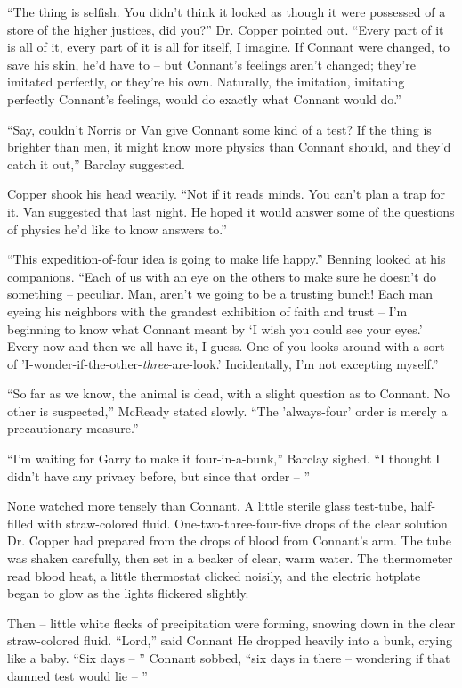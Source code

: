 \documentclass[letterpaper,openany,12pt]{memoir}		%
\begin{document}
``The thing is selfish. You didn't think it looked as though it were possessed
of a store of the higher justices, did you?'' Dr. Copper pointed out. ``Every
part of it is all of it, every part of it is all for itself, I imagine. If
Connant were changed, to save his skin, he'd have to -- but Connant's feelings
aren't changed; they're imitated perfectly, or they're his own. Naturally, the
imitation, imitating perfectly Connant's feelings, would do exactly what Connant
would do.''

``Say, couldn't Norris or Van give Connant some kind of a test? If the thing is
brighter than men, it might know more physics than Connant should, and they'd
catch it out,'' Barclay suggested.

Copper shook his head wearily. ``Not if it reads minds. You can't plan a trap
for it. Van suggested that last night. He hoped it would answer some of the
questions of physics he'd like to know answers to.''

``This expedition-of-four idea is going to make life happy.'' Benning looked at
his companions. ``Each of us with an eye on the others to make sure he doesn't
do something -- peculiar. Man, aren't we going to be a trusting bunch! Each man
eyeing his neighbors with the grandest exhibition of faith and trust -- I'm
beginning to know what Connant meant by `I wish you could see your eyes.' Every
now and then we all have it, I guess. One of you looks around with a sort of
'I-wonder-if-the-other-\emph{three}-are-look.' Incidentally, I'm not excepting
myself.''

``So far as we know, the animal is dead, with a slight question as to Connant.
No other is suspected,'' McReady stated slowly. ``The 'always-four' order is
merely a precautionary measure.''

``I'm waiting for Garry to make it four-in-a-bunk,'' Barclay sighed. ``I thought
I didn't have any privacy before, but since that order -- ''

None watched more tensely than Connant. A little sterile glass test-tube,
half-filled with straw-colored fluid. One-two-three-four-five drops of the clear
solution Dr. Copper had prepared from the drops of blood from Connant's arm. The
tube was shaken carefully, then set in a beaker of clear, warm water. The
thermometer read blood heat, a little thermostat clicked noisily, and the
electric hotplate began to glow as the lights flickered slightly.

Then -- little white flecks of precipitation were forming, snowing down in the
clear straw-colored fluid. ``Lord,'' said Connant He dropped heavily into a
bunk, crying like a baby. ``Six days -- '' Connant sobbed, ``six days in there
-- wondering if that damned test would lie -- ''
\end{document}
